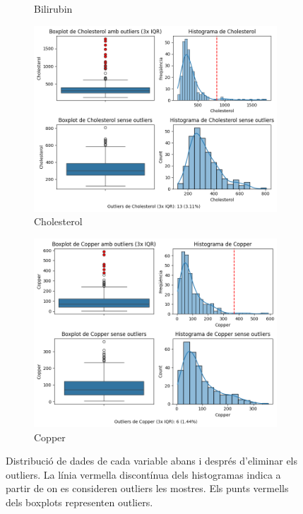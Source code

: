 \begin{figure}[H]
\begin{subfigure}{.5\textwidth}
  \caption{Bilirubin}
\end{subfigure}
\begin{subfigure}{.5\textwidth}
  \centering
  \includegraphics[width=.95\linewidth]{img/outliers_Cholesterol.png}
  \caption{Cholesterol}
\end{subfigure}%
\begin{subfigure}{.5\textwidth}
  \centering
  \includegraphics[width=.95\linewidth]{img/outliers_Copper.png}
  \caption{Copper}
\end{subfigure}

\caption{Distribució de dades de cada variable abans i després d'eliminar els outliers. La línia vermella discontínua dels histogramas indica a partir de on es consideren outliers les mostres. Els punts vermells dels boxplots representen outliers.}
\label{fig:outliers-1}
\end{figure}


